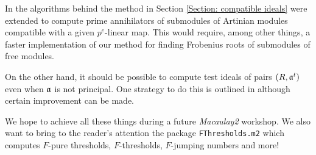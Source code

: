 \documentclass[11pt]{amsart}
\begin{document}
In \cite{KatzmanZhangAlgorithm} the algorithms behind the method in Section \ref{Section: compatible ideals} were extended
to compute prime annihilators of submodules of Artinian modules compatible with a given $p^{e}$-linear map.
This would require, among other things, a faster implementation of our method for finding Frobenius roots of submodules of free modules.

On the other hand, it should be possible to compute test ideals of pairs $(R, \mathfrak{a}^t)$ even when $\mathfrak{a}$ is not principal.  One strategy to do this is outlined in \cite{SchwedeTuckerTestIdealsOfNonPrincipal} although certain improvement can be made.

We hope to achieve all these things during a future \emph{Macaulay2} workshop.  We also want to bring to the reader's attention the package {\tt FThresholds.m2} which computes $F$-pure thresholds, $F$-thresholds, $F$-jumping numbers and more!



\end{document}
